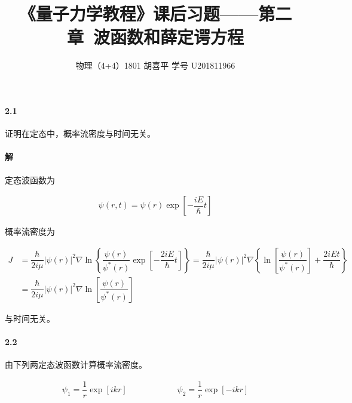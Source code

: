 \documentclass{article}
\author{物理（4+4）1801 \quad 胡喜平 \quad 学号 U201811966}
\affil{网站 https://hxp.plus/ \quad 邮件 hxp201406@gmail.com}
\title{《量子力学教程》课后习题——第二章\ 波函数和薛定谔方程}
\begin{document}
\maketitle\thispagestyle{fancy}

\paragraph{2.1}

证明在定态中，概率流密度与时间无关。

\paragraph{解}

定态波函数为

\begin{equation*}
  \begin{aligned}
    \psi \left( r,t \right) = \psi \left( r \right) \exp \left[ - \dfrac{i E}{\hbar} t  \right]
  \end{aligned}
\end{equation*}

概率流密度为

\begin{equation*}
  \begin{aligned}
    J &= \dfrac{\hbar}{2i \mu} \left| \psi \left( r \right) \right|^2 \nabla \ln \left\{ \dfrac{\psi \left( r \right)}{\psi^{*} \left( r \right)} \exp \left[ - \dfrac{2 i E}{\hbar}t  \right]  \right\}
    =\dfrac{\hbar}{2i\mu} \left| \psi \left( r \right) \right|^2 \nabla \left\{ \ln \left[ \dfrac{\psi \left( r \right)}{\psi^{*} \left( r \right)}  \right] + \dfrac{2iEt}{\hbar}  \right\} \\
    &= \dfrac{\hbar}{2i\mu} \left| \psi \left( r \right) \right|^2 \nabla \ln \left[ \dfrac{\psi \left( r \right)}{\psi^{*} \left( r \right)}  \right]
  \end{aligned}
\end{equation*}

与时间无关。

\paragraph{2.2}

由下列两定态波函数计算概率流密度。

\begin{equation*}
  \begin{aligned}
    \psi_1 = \dfrac{1}{r} \exp \left[ i k r \right]
    \quad\quad \quad\quad \quad\quad 
    \psi_2 = \dfrac{1}{r} \exp \left[ - i k r \right] 
  \end{aligned}
\end{equation*}
\end{document}

